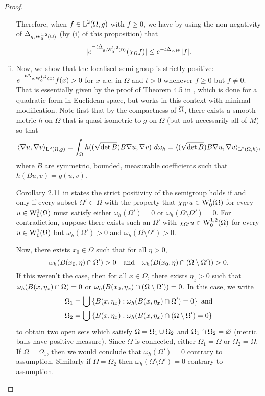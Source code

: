 \documentclass[a4paper, 12pt]{amsart}
\begin{document}
\begin{proof}
\begin{enumerate}[(i)]
        Therefore, when $f \in \Lp{2}(\Omega,g)$ with $f \geq 0$, we have by using the non-negativity of $\Delta_{g, \SobH[0]{1}(\Omega)}$ (by (i) of this proposition) that
	$$ \modulus{e^{-t\Delta_{g, \SobH[0]{1}(\Omega)}} (\chi_{\Omega} f)} \leq e^{-t \Delta_{g, \cW}} \modulus{f}.$$

\item Now, we show that the localised semi-group is strictly positive: $e^{-t\Delta_{g,\SobH[0]{1}(\Omega)}}f (x) > 0$ for $x$-a.e. in $\Omega$ and $t>0$ whenever $f \geq 0$ but $f \neq 0$.
	That is essentially given by the proof of Theorem 4.5 in \cite{El-Maati}, which is done for a quadratic form in Euclidean space, but works in this context with minimal modification.
	Note first that by the compactness of $\close{\Omega}$, there exists a smooth metric $h$ on $\Omega$ that is quasi-isometric to $g$ on $\Omega$   (but not necessarily all of $M$) so that 
	$$\inprod{\nabla u, \nabla v}_{\Lp{2}(\Omega,g)} = \int_{\Omega} h((\sqrt{\det B}) B \nabla u, \nabla v)\ d\omega_h = \inprod{(\sqrt{\det B})B \nabla u, \nabla v}_{\Lp{2}(\Omega,h)},
	$$
	where $B$ are symmetric, bounded, measurable coefficients such that $h(Bu,v) = g(u,v)$.

	Corollary 2.11 in \cite{El-Maati} states the strict positivity of the semigroup  holds if and only if every subset $\Omega' \subset \Omega$ with the property that $\chi_{\Omega'} u \in \Sob[0]{1}(\Omega)$ for every $u \in \Sob[0]{1}(\Omega)$ must satisfy either $\omega_h(\Omega') = 0$ or $\omega_h(\Omega\setminus \Omega') = 0$. 
	For contradiction, suppose there exists such an $\Omega'$ with $\chi_{\Omega'} u \in \SobH[0]{1}(\Omega)$ for every $u \in \Sob[0]{1}(\Omega)$ but $\omega_h(\Omega') > 0$ and $\omega_h(\Omega \setminus \Omega') > 0$.

        Now, there exists $x_0 \in \Omega$ such that for all $\eta > 0$,
	$$\omega_h(B(x_0, \eta) \intersect \Omega') > 0\quad\text{and}\quad\omega_h(B(x_0, \eta) \intersect (\Omega\setminus\Omega'))> 0.$$
	If this weren't the case, then for all $x \in \Omega$, there exists $\eta_x > 0$ such that $\omega_h(B(x, \eta_x) \intersect \Omega) = 0$ or $\omega_h(B(x_0, \eta_x) \intersect (\Omega\setminus\Omega')) = 0$. In this case, we write 
	\begin{align*} 
	\Omega_1 &= \Union \set{B(x,\eta_x): \omega_h(B(x, \eta_x) \intersect \Omega') = 0}\ \text{and}\\
	\Omega_2 &= \Union \set{B(x,\eta_x): \omega_h(B(x, \eta_x) \intersect(\Omega \setminus \Omega') = 0}
	\end{align*}
	to obtain two open sets which satisfy $\Omega = \Omega_1 \union \Omega_2$ and $\Omega_1 \intersect \Omega_2 = \emptyset$ (metric balls have positive measure). Since $\Omega$ is connected, either $\Omega_1 = \Omega$ or $\Omega_2 = \Omega$. If $\Omega = \Omega_1$, then we would conclude that $\omega_h(\Omega') = 0$ contrary to assumption. Similarly if $\Omega = \Omega_2$ then $\omega_h(\Omega \setminus \Omega') = 0$ contrary to assumption.


\end{enumerate}
\end{proof}
\end{document}
